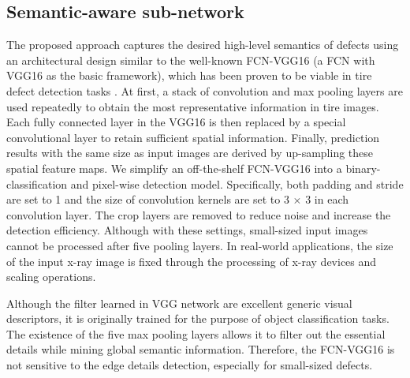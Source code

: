 \documentclass{article}
\begin{document}
\subsection{Semantic-aware sub-network}
\label{Semantic-aware sub-network}
The proposed approach captures the desired high-level semantics of defects using an architectural design similar to the well-known FCN-VGG16 (a FCN with VGG16 as the basic framework), which has been proven to be viable in tire defect detection tasks \cite{wang2019tire}. At first, a stack of convolution and max pooling layers are used repeatedly to obtain the most representative information in tire images. Each fully connected layer in the VGG16 is then replaced by a special convolutional layer to retain sufficient spatial information. Finally, prediction results with the same size as input images are derived by up-sampling these spatial feature maps. We simplify an off-the-shelf FCN-VGG16 into a binary-classification and pixel-wise detection model. Specifically, both padding and stride are set to 1 and the size of convolution kernels are set to 3 $\times$ 3 in each convolution layer. The crop layers are removed to reduce noise and increase the detection efficiency. Although with these settings, small-sized input images cannot be processed after five pooling layers. In real-world applications, the size of the input x-ray image is fixed through the processing of x-ray devices and scaling operations.

Although the filter learned in VGG network are excellent generic visual descriptors, it is originally trained for the purpose of object classification tasks. The existence of the five max pooling layers allows it to filter out the essential details while mining global semantic information. Therefore, the FCN-VGG16 is not sensitive to the edge details detection, especially for small-sized defects.
\end{document}
